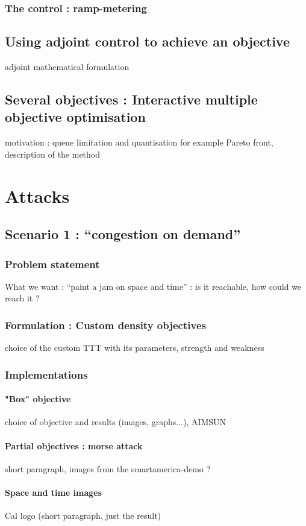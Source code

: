 \documentclass[11pt, oneside]{article}   	%
\begin{document}
		\subsubsection{The control : ramp-metering}	
	\subsection{Using adjoint control to achieve an objective}
		adjoint mathematical formulation
	\subsection{Several objectives : Interactive multiple objective optimisation}
		motivation : queue limitation and quantisation for example
		Pareto front, description of the method
		
\section{Attacks}
	\subsection{Scenario 1 : ``congestion on demand''}
		\subsubsection{Problem statement}
			What we want : ``paint a jam on space and time'' : is it reachable, how could we reach it ?
		\subsubsection{Formulation : Custom density objectives}
			choice of the custom TTT with its parameters, strength and weakness
		\subsubsection{Implementations}
			\paragraph{"Box" objective}
				choice of objective and results (images, graphs...), AIMSUN
			\paragraph{Partial objectives : morse attack}
				short paragraph, images from the smartamerica-demo ?
			\paragraph{Space and time images}
				Cal logo (short paragraph, just the result)
\end{document}
